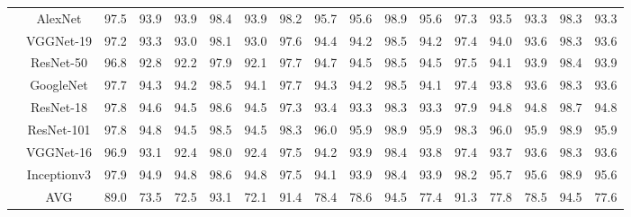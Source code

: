 \documentclass[12pt,italian]{article}
\begin{document}
\begin{tiny}
\begin{longtable}{lcccccccccccccccc}
& AlexNet & 97.5 & 93.9 & 93.9 & 98.4 & 93.9 & 98.2 & 95.7 & 95.6 & 98.9 & 95.6 & 97.3 & 93.5 & 93.3 & 98.3 & 93.3 \\ 
& VGGNet-19 & 97.2 & 93.3 & 93.0 & 98.1 & 93.0 & 97.6 & 94.4 & 94.2 & 98.5 & 94.2 & 97.4 & 94.0 & 93.6 & 98.3 & 93.6 \\ 
& ResNet-50 & 96.8 & 92.8 & 92.2 & 97.9 & 92.1 & 97.7 & 94.7 & 94.5 & 98.5 & 94.5 & 97.5 & 94.1 & 93.9 & 98.4 & 93.9 \\ 
& GoogleNet & 97.7 & 94.3 & 94.2 & 98.5 & 94.1 & 97.7 & 94.3 & 94.2 & 98.5 & 94.1 & 97.4 & 93.8 & 93.6 & 98.3 & 93.6 \\ 
& ResNet-18 & 97.8 & 94.6 & 94.5 & 98.6 & 94.5 & 97.3 & 93.4 & 93.3 & 98.3 & 93.3 & 97.9 & 94.8 & 94.8 & 98.7 & 94.8 \\ 
& ResNet-101 & 97.8 & 94.8 & 94.5 & 98.5 & 94.5 & 98.3 & 96.0 & 95.9 & 98.9 & 95.9 & 98.3 & 96.0 & 95.9 & 98.9 & 95.9 \\ 
& VGGNet-16 & 96.9 & 93.1 & 92.4 & 98.0 & 92.4 & 97.5 & 94.2 & 93.9 & 98.4 & 93.8 & 97.4 & 93.7 & 93.6 & 98.3 & 93.6 \\ 
& Inceptionv3 & 97.9 & 94.9 & 94.8 & 98.6 & 94.8 & 97.5 & 94.1 & 93.9 & 98.4 & 93.9 & 98.2 & 95.7 & 95.6 & 98.9 & 95.6 \\ 
\hline
& AVG & 89.0 & 73.5 & 72.5 & 93.1 & 72.1 & 91.4 & 78.4 & 78.6 & 94.5 & 77.4 & 91.3 & 77.8 & 78.5 & 94.5 & 77.6 \\ 
\hline
\bottomrule
\end{longtable} 

 \pagebreak 
\end{tiny} 
 
\end{document}
